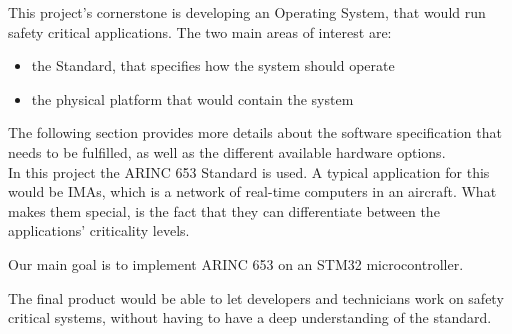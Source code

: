 This project's cornerstone is developing an Operating System, that would run safety critical 
applications. The two main areas of interest are:
\begin{itemize}
\item the Standard, that specifies how the system should operate
\item the physical platform that would contain the system
\end{itemize}
 The following section
provides more details about the software specification that needs to be fulfilled, as well as
the different available hardware options.
\\
In this project the ARINC 653 Standard is used. A typical application for this would be IMAs, which 
is a network of real-time computers in an aircraft. What makes them special, is the fact that they can
differentiate between the applications' criticality levels.

Our main goal is to implement ARINC 653 on an STM32 microcontroller.

The final product would be able to let developers and technicians work on safety critical systems,
 without having to have a deep understanding of the standard.
